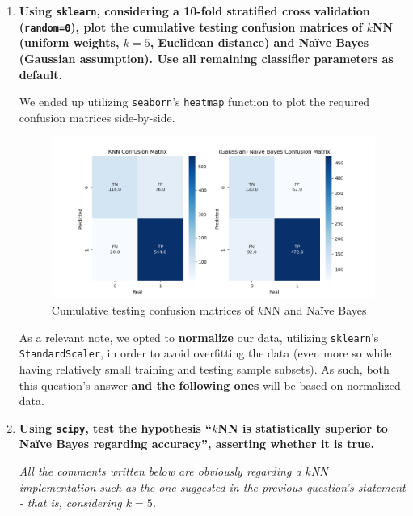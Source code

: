 \documentclass[12pt]{article}
\begin{document}
\begin{enumerate}[leftmargin=\labelsep,resume]
  \item \textbf{Using \texttt{sklearn}, considering a 10-fold stratified cross validation (\texttt{random=0}), plot the cumulative
          testing confusion matrices of $k$NN (uniform weights, $k = 5$, Euclidean distance) and Naïve Bayes
          (Gaussian assumption). Use all remaining classifier parameters as default.}

        We ended up utilizing \texttt{seaborn}'s \texttt{heatmap} function to plot the
        required confusion matrices side-by-side.

        \begin{figure}[h]
          \centering
          \includegraphics[width=\textwidth]{../assets/hw2-2.1.png}
          \caption{Cumulative testing confusion matrices of $k$NN and Naïve Bayes}
          \label{fig:fig1}
        \end{figure}

        \begin{sloppypar}
          As a relevant note, we opted to \textbf{normalize} our data, utilizing \texttt{sklearn}'s
          \texttt{StandardScaler}, in order to avoid overfitting the data (even more so while
          having relatively small training and testing sample subsets). As such, both this
          question's answer \textbf{and the following ones} will be based on normalized data.
        \end{sloppypar}

        \pagebreak

  \item \textbf{Using \texttt{scipy}, test the hypothesis “$k$NN is statistically superior to Naïve Bayes regarding
          accuracy”, asserting whether it is true.}

        \textit{All the comments written below are obviously regarding a $k$NN implementation
          such as the one suggested in the previous question's statement - that is,
          considering $k = 5$.}


\end{enumerate}
\end{document}
